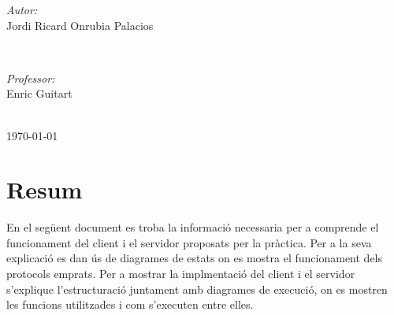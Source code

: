 \documentclass[11pt]{article}
\begin{document}
\begin{titlepage}
\begin{minipage}{0.4\textwidth}
\begin{flushleft} \large
\emph{Autor:}\\
Jordi Ricard Onrubia Palacios %
\end{flushleft}
\end{minipage}
~
\begin{minipage}{0.4\textwidth}
\begin{flushright} \large
\emph{Professor:} \\
Enric Guitart %
\end{flushright}
\end{minipage}\\[4cm]

{\large \today}\\[3cm] %
\vfill %
\end{titlepage}

\newpage
\section*{Resum}
En el següent document es troba la informació necessaria per a comprende el funcionament del client i el servidor proposats per la pràctica. Per a la seva explicació es dan ús de diagrames de estats on es mostra el funcionament dels protocols emprats. Per a mostrar la implmentació del client i el servidor s'explique l'estructuració juntament amb diagrames de execució, on es mostren les funcions utilitzades i com s'executen entre elles. 
\justify
\thispagestyle{empty}
\newpage
\thispagestyle{empty}
\tableofcontents
\newpage
\clearpage
{}
\end{document}
